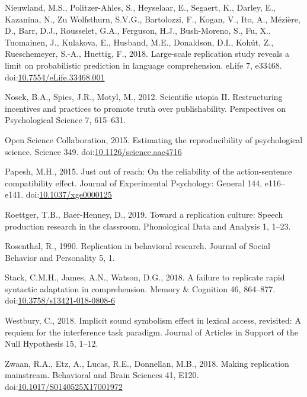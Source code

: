 \documentclass[]{elsarticle} %
\newlength{\cslhangindent}
\newlength{\cslentryspacingunit} %
\newenvironment{CSLReferences}[2] %
 {%
  \setlength{\parindent}{0pt}
  \ifodd #1
  \let\oldpar\par
  \def\par{\hangindent=\cslhangindent\oldpar}
  \fi
  \setlength{\parskip}{#2\cslentryspacingunit}
 }%
 {}
\begin{document}
\begin{CSLReferences}{1}{0}
\leavevmode{}%
Nieuwland, M.S., Politzer-Ahles, S., Heyselaar, E., Segaert, K., Darley,
E., Kazanina, N., Zu Wolfsthurn, S.V.G., Bartolozzi, F., Kogan, V., Ito,
A., Mézière, D., Barr, D.J., Rousselet, G.A., Ferguson, H.J.,
Bush-Moreno, S., Fu, X., Tuomainen, J., Kulakova, E., Husband, M.E.,
Donaldson, D.I., Kohút, Z., Rueschemeyer, S.-A., Huettig, F., 2018.
Large-scale replication study reveals a limit on probabilistic
prediction in language comprehension. eLife 7, e33468.
doi:\href{https://doi.org/10.7554/eLife.33468.001}{10.7554/eLife.33468.001}

\leavevmode{}%
Nosek, B.A., Spies, J.R., Motyl, M., 2012. Scientific utopia {II}.
{Restructuring} incentives and practices to promote truth over
publishability. Perspectives on Psychological Science 7, 615--631.

\leavevmode{}%
Open Science Collaboration, 2015. Estimating the reproducibility of
psychological science. Science 349.
doi:\href{https://doi.org/10.1126/science.aac4716}{10.1126/science.aac4716}

\leavevmode{}%
Papesh, M.H., 2015. Just out of reach: {On} the reliability of the
action-sentence compatibility effect. Journal of Experimental
Psychology: General 144, e116--e141.
doi:\href{https://doi.org/10.1037/xge0000125}{10.1037/xge0000125}

\leavevmode{}%
Roettger, T.B., Baer-Henney, D., 2019. Toward a replication culture:
{Speech} production research in the classroom. Phonological Data and
Analysis 1, 1--23.

\leavevmode{}%
Rosenthal, R., 1990. Replication in behavioral research. Journal of
Social Behavior and Personality 5, 1.

\leavevmode{}%
Stack, C.M.H., James, A.N., Watson, D.G., 2018. A failure to replicate
rapid syntactic adaptation in comprehension. Memory \& Cognition 46,
864--877.
doi:\href{https://doi.org/10.3758/s13421-018-0808-6}{10.3758/s13421-018-0808-6}

\leavevmode{}%
Westbury, C., 2018. Implicit sound symbolism effect in lexical access,
revisited: {A} requiem for the interference task paradigm. Journal of
Articles in Support of the Null Hypothesis 15, 1--12.

\leavevmode{}%
Zwaan, R.A., Etz, A., Lucas, R.E., Donnellan, M.B., 2018. Making
replication mainstream. Behavioral and Brain Sciences 41, E120.
doi:\href{https://doi.org/10.1017/S0140525X17001972}{10.1017/S0140525X17001972}

\end{CSLReferences}
\end{document}
